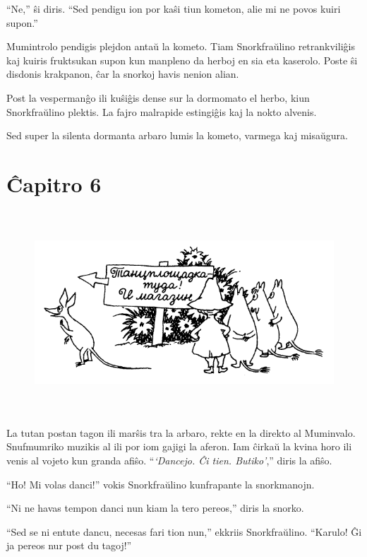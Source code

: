 ``Ne,'' ŝi diris. ``Sed pendigu ion por kaŝi tiun kometon, alie mi ne povos kuiri supon.''

Mumintrolo pendigis plejdon antaŭ la kometo. Tiam Snorkfraŭlino retrankviliĝis kaj kuiris fruktsukan supon kun manpleno da herboj en sia eta kaserolo. Poste ŝi disdonis krakpanon, ĉar la snorkoj havis nenion alian.

Post la vespermanĝo ili kuŝiĝis dense sur la dormomato el herbo, kiun Snorkfraŭlino plektis. La fajro malrapide estingiĝis kaj la nokto alvenis.

Sed super la silenta dormanta arbaro lumis la kometo, varmega kaj misaŭgura.

\chapter*[Ĉapitro 6]{Ĉapitro 6}


\begin{figure}[htbp]
\centering
\includegraphics[width=450pt,height=214pt]{6-1.png}
\caption{}
\label{6-1}
\end{figure}

La tutan postan tagon ili marŝis tra la arbaro, rekte en la direkto al Muminvalo. Snufmumriko muzikis al ili por iom gajigi la aferon. Iam ĉirkaŭ la kvina horo ili venis al vojeto kun granda afiŝo. ``\emph{`Dancejo. Ĉi tien. Butiko'},'' diris la afiŝo.

``Ho! Mi volas danci!'' vokis Snorkfraŭlino kunfrapante la snorkmanojn.

``Ni ne havas tempon danci nun kiam la tero pereos,'' diris la snorko.

``Sed se ni entute dancu, necesas fari tion nun,'' ekkriis Snorkfraŭlino. ``Karulo! Ĝi ja pereos nur post du tagoj!''

